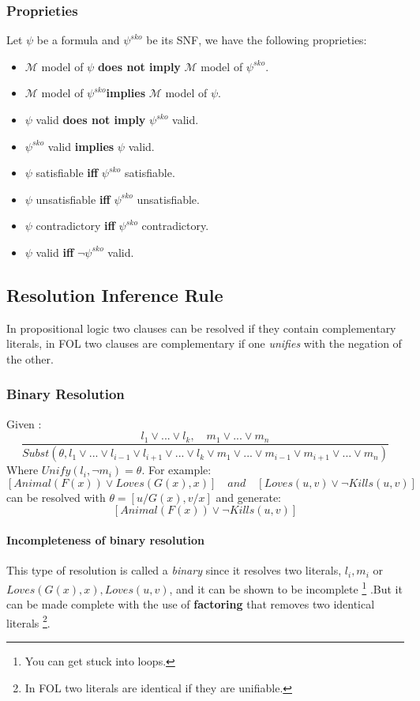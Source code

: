 \documentclass[10pt,a4paper]{article}
\newcommand{\subst}[1]{Subst(\theta,#1)}
\begin{document}
\subsubsection{Proprieties}
Let $\psi$ be a formula and $\psi^{sko}$ be its SNF, we have the following proprieties:
\begin{itemize}
\item $\mathcal{M}$ model of $\psi$ \textbf{does not imply}  $\mathcal{M}$ model of $\psi^{sko}$.
\item $\mathcal{M}$ model of $\psi^{sko}$\textbf{implies}  $\mathcal{M}$ model of $\psi$.

\item $\psi$ valid \textbf{does not imply}  $\psi^{sko}$ valid.
\item $\psi^{sko}$ valid \textbf{implies}  $\psi$ valid.

\item $\psi$ satisfiable \textbf{iff}  $\psi^{sko}$ satisfiable.
\item $\psi$ unsatisfiable \textbf{iff}  $\psi^{sko}$ unsatisfiable.
\item $\psi$ contradictory \textbf{iff}  $\psi^{sko}$ contradictory.
\item $\psi$ valid \textbf{iff}  $\neg \psi^{sko}$ valid.

\end{itemize}



\subsection{Resolution Inference Rule}
In propositional logic two clauses can be resolved if they contain complementary literals, in FOL two clauses are complementary if one \textit{unifies} with the negation of the other.

\subsubsection{Binary Resolution}
\label{sec:binaryresolution}
Given :
\[\frac{l_1\vee...\vee l_k,\quad m_1\vee...\vee m_n}{\subst{l_1 \vee ... \vee l_{i-1}\vee l_{i+1}\vee ... \vee l_k\vee m_1 \vee ... \vee m_{i-1}\vee m_{i+1}\vee ... \vee m_n}}\]
Where $Unify(l_i,\neg m_i)=\theta$. For example:
\[[Animal(F(x))\vee Loves(G(x),x)]\quad and \quad [Loves(u,v)\vee \neg Kills(u,v)]\]
can be resolved with $\theta=[u/G(x),v/x]$ and generate:
\[[Animal(F(x))\vee \neg Kills(u,v)]\]

\paragraph{Incompleteness of binary resolution}
This type of resolution is called a \textit{binary} since it resolves two literals, $l_i,m_i$ or $Loves(G(x),x),Loves(u,v)$, and it can be shown to be incomplete \footnote{You can get stuck into loops.} .But it can be made complete with the use of \textbf{factoring} that removes two identical literals \footnote{In FOL two literals are identical if they are unifiable. }.
\end{document}
